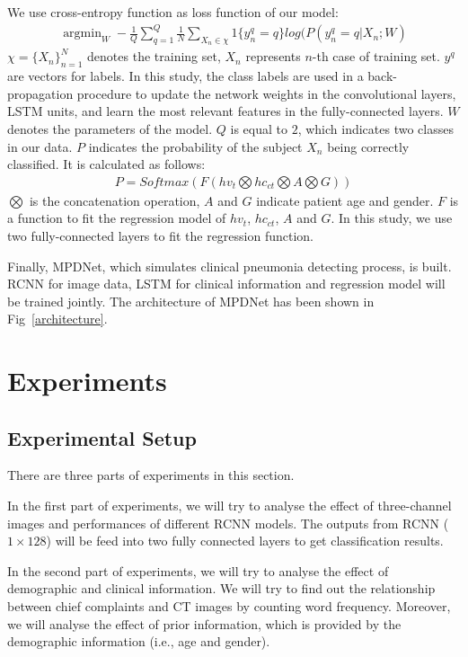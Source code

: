 \documentclass[journal]{IEEEtran}
\begin{document}
We use cross-entropy function as loss function of our model:
\begin{align*}\label{classifyandloss1}
    \mathop{\arg\min}_{W} -\frac{1}{Q} \sum_{q=1}^{Q} \frac{1}{N} \sum_{X_n\in\chi} 1 \{ y_n^q = q\} log(P(y_n^q=q|X_n;W)
\end{align*}
$\chi=\{X_n\}_{n=1}^N$ denotes the training set, $X_n$ represents $n$-th case of training set. $y^q$ are vectors for labels. In this study, the class labels are used in a back-propagation procedure to update the network weights in the convolutional layers, LSTM units, and learn the most relevant features in the fully-connected layers. $W$ denotes the parameters of the model. $Q$ is equal to $2$, which indicates two classes in our data.
$P$ indicates the probability of the subject $X_n$ being correctly classified. It is calculated as follows:
\begin{align*}
    P = Softmax(F(hv_t \bigotimes hc_{ct} \bigotimes A \bigotimes G))
\end{align*}
$\bigotimes$ is the concatenation operation, $A$ and $G$ indicate patient age and gender. $F$ is a function to fit the regression model of $hv_t$, $hc_{ct}$, $A$ and $G$. In this study, we use two fully-connected layers to fit the regression function. 

Finally, MPDNet, which simulates clinical pneumonia detecting process, is built. RCNN for image data, LSTM for clinical information and regression model will be trained jointly. The architecture of MPDNet has been shown in Fig~\ref{architecture}.

\section{Experiments}
\label{experiments}

\subsection{Experimental Setup}
\label{experimentalsetup}
There are three parts of experiments in this section.

In the first part of experiments, we will try to analyse the effect of three-channel images and performances of different RCNN models.
The outputs from RCNN ($1 \times 128$) will be feed into two fully connected layers to get classification results. 

In the second part of experiments, we will try to analyse the effect of demographic and clinical information. We will try to find out the relationship between chief complaints and CT images by counting word frequency. Moreover, we will analyse the effect of prior information, which is provided by the demographic information (i.e., age and gender).
\end{document}
